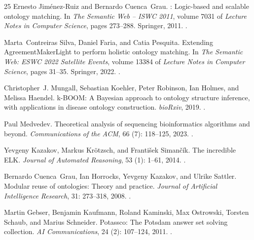 \documentclass[10pt]{article}
\theoremstyle{accentdef}
\begin{document}
\begin{thebibliography}{25}
Ernesto Jim{\'e}nez-Ruiz and Bernardo Cuenca~Grau.
: Logic-based and scalable ontology matching.
\newblock In \emph{The Semantic Web -- ISWC 2011}, volume 7031 of \emph{Lecture
  Notes in Computer Science}, pages 273--288. Springer, 2011.
\newblock {}.

Marta~Contreiras Silva, Daniel Faria, and Catia Pesquita.
\newblock Extending {AgreementMakerLight} to perform holistic ontology
  matching.
\newblock In \emph{The Semantic Web: ESWC 2022 Satellite Events}, volume 13384
  of \emph{Lecture Notes in Computer Science}, pages 31--35. Springer, 2022.
\newblock {}.

Christopher~J. Mungall, Sebastian Koehler, Peter Robinson, Ian Holmes, and
  Melissa Haendel.
\newblock k-{BOOM}: A {Bayesian} approach to ontology structure inference, with
  applications in disease ontology construction.
\newblock \emph{bioRxiv}, 2019.
\newblock {}.

Paul Medvedev.
\newblock Theoretical analysis of sequencing bioinformatics algorithms and
  beyond.
\newblock \emph{Communications of the ACM}, 66 (7): 118--125,
  2023.
\newblock {}.

Yevgeny Kazakov, Markus Kr\"otzsch, and Franti\v{s}ek Siman\v{c}\'ik.
\newblock The incredible {ELK}.
\newblock \emph{Journal of Automated Reasoning}, 53 (1):
  1--61, 2014.
\newblock {}.

Bernardo Cuenca~Grau, Ian Horrocks, Yevgeny Kazakov, and Ulrike Sattler.
\newblock Modular reuse of ontologies: Theory and practice.
\newblock \emph{Journal of Artificial Intelligence Research}, 31:
  273--318, 2008.
\newblock {}.

Martin Gebser, Benjamin Kaufmann, Roland Kaminski, Max Ostrowski, Torsten
  Schaub, and Marius Schneider.
\newblock Potassco: The {Potsdam} answer set solving collection.
\newblock \emph{AI Communications}, 24 (2): 107--124, 2011.
\newblock {}.


\end{thebibliography}
\end{document}
